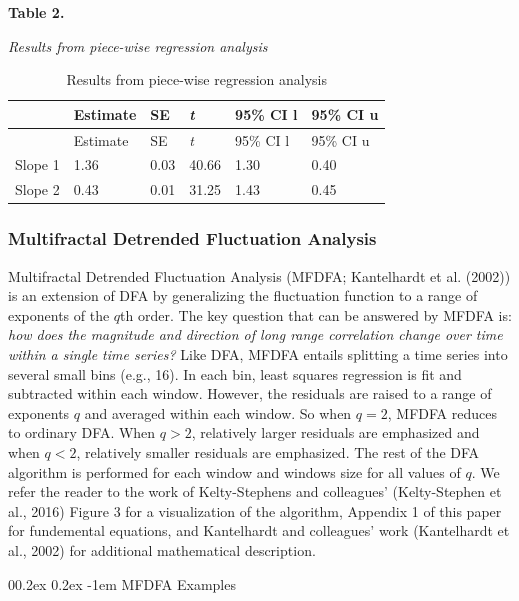 \documentclass[
  man]{apa6}
\makeatletter
\let\oldparagraph\paragraph
\renewcommand{\paragraph}[1]{\oldparagraph{#1}\mbox{}}
\renewcommand{\paragraph}{\@startsection{paragraph}{4}{\parindent}%
  {0\baselineskip \@plus 0.2ex \@minus 0.2ex}%
  {-1em}%
  {\normalfont\normalsize\bfseries\itshape\typesectitle}}
\makeatother
\begin{document}
\textbf{Table 2.}

\emph{Results from piece-wise regression analysis}

\begin{longtable}[]{@{}llllll@{}}
\caption{Results from piece-wise regression analysis}\tabularnewline
\toprule()
& Estimate & SE & \emph{t} & 95\% CI l & 95\% CI u \\
\midrule()
\endfirsthead
\toprule()
& Estimate & SE & \emph{t} & 95\% CI l & 95\% CI u \\
\midrule()
\endhead
Slope 1 & 1.36 & 0.03 & 40.66 & 1.30 & 0.40 \\
Slope 2 & 0.43 & 0.01 & 31.25 & 1.43 & 0.45 \\
\bottomrule()
\end{longtable}

\hypertarget{multifractal-detrended-fluctuation-analysis}{%
\subsubsection{Multifractal Detrended Fluctuation Analysis}\label{multifractal-detrended-fluctuation-analysis}}

Multifractal Detrended Fluctuation Analysis (MFDFA;
Kantelhardt et al. (2002)) is an extension of DFA
by generalizing the fluctuation function to a range of exponents of the
\(q\)th order. The key question that can be answered by MFDFA is: \emph{how
does the magnitude and direction of long range correlation change over
time within a single time series?} Like DFA, MFDFA entails splitting a
time series into several small bins (e.g., 16). In each bin, least
squares regression is fit and subtracted within each window. However,
the residuals are raised to a range of exponents \(q\) and averaged within
each window. So when \(q = 2\), MFDFA reduces to ordinary DFA. When
\(q >2\), relatively larger residuals are emphasized and when \(q < 2\),
relatively smaller residuals are emphasized. The rest of the DFA
algorithm is performed for each window and windows size for all values
of \(q\). We refer the reader to the work of Kelty-Stephens and
colleagues' (Kelty-Stephen et al., 2016) Figure
3 for a visualization of the algorithm, Appendix 1 of this paper for
fundemental equations, and Kantelhardt and colleagues' work
(Kantelhardt et al., 2002) for additional
mathematical description.

\hypertarget{mfdfa-examples}{%
\paragraph{MFDFA Examples}\label{mfdfa-examples}}
\end{document}
